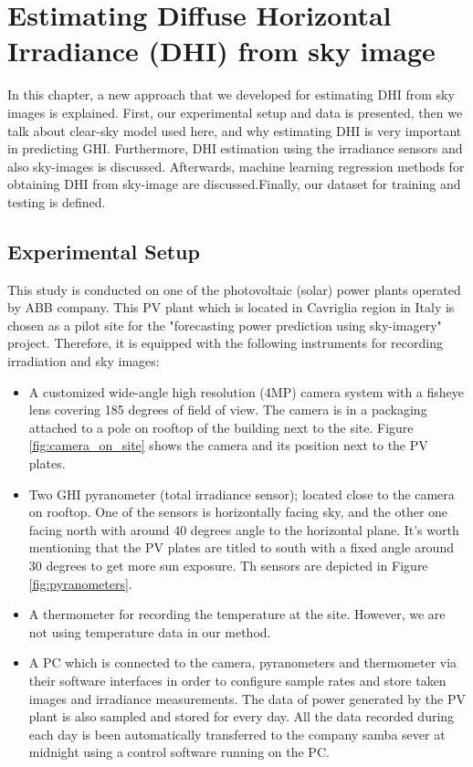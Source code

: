 \chapter{Estimating Diffuse Horizontal Irradiance (DHI) from sky image}
\label{sec:my_work_chapter}
In this chapter, a new approach that we developed for estimating DHI from sky images is explained. First, our experimental setup and data is presented, then we talk about clear-sky model used here, and why estimating DHI is very important in predicting GHI. Furthermore, DHI estimation using the irradiance sensors and also sky-images is discussed. Afterwards, machine learning regression methods for obtaining DHI from sky-image are discussed.Finally, our dataset for training and testing is defined.

\section{Experimental Setup}
This study is conducted on one of the photovoltaic (solar) power plants operated by ABB company. This PV plant which is located in Cavriglia region in Italy is chosen as a pilot site for the "forecasting power prediction using sky-imagery" project. Therefore, it is equipped with the following instruments for recording irradiation and sky images:
\begin{itemize}
\item A customized wide-angle high resolution (4MP) camera system with a fisheye lens covering 185 degrees of field of view. The camera is in a packaging attached to a pole on rooftop of the building next to the site. Figure \ref{fig:camera_on_site} shows the camera and its position next to the PV plates.
\item Two GHI pyranometer (total irradiance sensor); located close to the camera on rooftop. One of the sensors is horizontally facing sky, and the other one facing north with around 40 degrees angle to the horizontal plane. It's worth mentioning that the PV plates are titled to south with a fixed angle around 30 degrees to get more sun exposure. Th sensors are depicted in Figure \ref{fig:pyranometers}.
\item A thermometer for recording the temperature at the site. However, we are not using temperature data in our method.
\item A PC which is connected to the camera, pyranometers and thermometer via their software interfaces in order to configure sample rates and store taken images and irradiance measurements. The data of power generated by the PV plant is also sampled and stored for every day. All the data recorded during each day is been automatically transferred to the company samba sever at midnight using a control software running on the PC.
\end{itemize}


